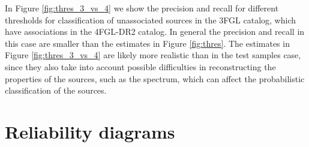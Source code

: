 \documentclass{aa}
\newcommand{\lb}{\label}
\begin{document}
\begin{appendix}
In Figure \ref{fig:thres_3_vs_4} we show the precision and recall for different thresholds for classification of unassociated sources in the 3FGL catalog, which have associations in the 4FGL-DR2 catalog. In general the precision and recall in this case are smaller than the estimates in Figure \ref{fig:thres}.  The estimates in Figure \ref{fig:thres_3_vs_4} are likely more realistic than in the test samples case, since they also take into account possible difficulties in reconstructing the properties of the sources, such as the spectrum, which can affect the probabilistic classification of the sources.
\newpage
\section{Reliability diagrams}
\lb{sec:reliability}



\end{appendix}
\end{document}
